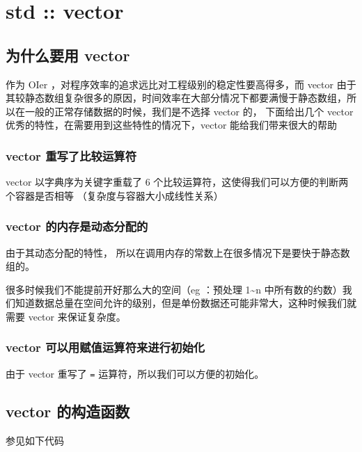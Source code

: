 
\section{std :: vector}

\subsection{为什么要用 vector}

作为 OIer ，对程序效率的追求远比对工程级别的稳定性要高得多，而 vector 由于其较静态数组复杂很多的原因，时间效率在大部分情况下都要满慢于静态数组，所以在一般的正常存储数据的时候，我们是不选择 vector 的， 下面给出几个 vector 优秀的特性，在需要用到这些特性的情况下，vector 能给我们带来很大的帮助

\subsubsection{vector 重写了比较运算符}

vector 以字典序为关键字重载了 6 个比较运算符，这使得我们可以方便的判断两个容器是否相等   （复杂度与容器大小成线性关系）

\subsubsection{vector 的内存是动态分配的}

由于其动态分配的特性， 所以在调用内存的常数上在很多情况下是要快于静态数组的。

很多时候我们不能提前开好那么大的空间（eg ：预处理 1\textasciitilde{}n 中所有数的约数）我们知道数据总量在空间允许的级别，但是单份数据还可能非常大，这种时候我们就需要 vector 来保证复杂度。

\subsubsection{vector 可以用赋值运算符来进行初始化}

由于 vector 重写了 \texttt{=} 运算符，所以我们可以方便的初始化。

\subsection{vector 的构造函数}

参见如下代码

